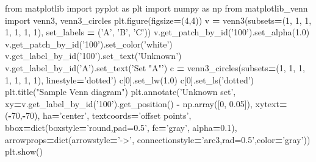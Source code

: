 \documentclass[]{book}
\newenvironment{Shaded}{\begin{snugshade}}{\end{snugshade}}
\newcommand{\BuiltInTok}[1]{#1}
\newcommand{\DecValTok}[1]{\textcolor[rgb]{0.00,0.00,0.81}{#1}}
\newcommand{\FloatTok}[1]{\textcolor[rgb]{0.00,0.00,0.81}{#1}}
\newcommand{\ImportTok}[1]{#1}
\newcommand{\NormalTok}[1]{#1}
\newcommand{\OperatorTok}[1]{\textcolor[rgb]{0.81,0.36,0.00}{\textbf{#1}}}
\newcommand{\StringTok}[1]{\textcolor[rgb]{0.31,0.60,0.02}{#1}}
\begin{document}
\begin{Shaded}
\begin{Highlighting}[]
\ImportTok{from}\NormalTok{ matplotlib }\ImportTok{import}\NormalTok{ pyplot }\ImportTok{as}\NormalTok{ plt}
\ImportTok{import}\NormalTok{ numpy }\ImportTok{as}\NormalTok{ np}
\ImportTok{from}\NormalTok{ matplotlib_venn }\ImportTok{import}\NormalTok{ venn3, venn3_circles}
\NormalTok{plt.figure(figsize}\OperatorTok{=}\NormalTok{(}\DecValTok{4}\NormalTok{,}\DecValTok{4}\NormalTok{))}
\NormalTok{v }\OperatorTok{=}\NormalTok{ venn3(subsets}\OperatorTok{=}\NormalTok{(}\DecValTok{1}\NormalTok{, }\DecValTok{1}\NormalTok{, }\DecValTok{1}\NormalTok{, }\DecValTok{1}\NormalTok{, }\DecValTok{1}\NormalTok{, }\DecValTok{1}\NormalTok{, }\DecValTok{1}\NormalTok{), set_labels }\OperatorTok{=}\NormalTok{ (}\StringTok{'A'}\NormalTok{, }\StringTok{'B'}\NormalTok{, }\StringTok{'C'}\NormalTok{))}
\NormalTok{v.get_patch_by_id(}\StringTok{'100'}\NormalTok{).set_alpha(}\FloatTok{1.0}\NormalTok{)}
\NormalTok{v.get_patch_by_id(}\StringTok{'100'}\NormalTok{).set_color(}\StringTok{'white'}\NormalTok{)}
\NormalTok{v.get_label_by_id(}\StringTok{'100'}\NormalTok{).set_text(}\StringTok{'Unknown'}\NormalTok{)}
\NormalTok{v.get_label_by_id(}\StringTok{'A'}\NormalTok{).set_text(}\StringTok{'Set "A"'}\NormalTok{)}
\NormalTok{c }\OperatorTok{=}\NormalTok{ venn3_circles(subsets}\OperatorTok{=}\NormalTok{(}\DecValTok{1}\NormalTok{, }\DecValTok{1}\NormalTok{, }\DecValTok{1}\NormalTok{, }\DecValTok{1}\NormalTok{, }\DecValTok{1}\NormalTok{, }\DecValTok{1}\NormalTok{, }\DecValTok{1}\NormalTok{), linestyle}\OperatorTok{=}\StringTok{'dotted'}\NormalTok{)}
\NormalTok{c[}\DecValTok{0}\NormalTok{].set_lw(}\FloatTok{1.0}\NormalTok{)}
\NormalTok{c[}\DecValTok{0}\NormalTok{].set_ls(}\StringTok{'dotted'}\NormalTok{)}
\NormalTok{plt.title(}\StringTok{"Sample Venn diagram"}\NormalTok{)}
\NormalTok{plt.annotate(}\StringTok{'Unknown set'}\NormalTok{, xy}\OperatorTok{=}\NormalTok{v.get_label_by_id(}\StringTok{'100'}\NormalTok{).get_position() }\OperatorTok{-}\NormalTok{ np.array([}\DecValTok{0}\NormalTok{, }\FloatTok{0.05}\NormalTok{]), xytext}\OperatorTok{=}\NormalTok{(}\OperatorTok{-}\DecValTok{70}\NormalTok{,}\OperatorTok{-}\DecValTok{70}\NormalTok{),}
\NormalTok{             ha}\OperatorTok{=}\StringTok{'center'}\NormalTok{, textcoords}\OperatorTok{=}\StringTok{'offset points'}\NormalTok{, bbox}\OperatorTok{=}\BuiltInTok{dict}\NormalTok{(boxstyle}\OperatorTok{=}\StringTok{'round,pad=0.5'}\NormalTok{, fc}\OperatorTok{=}\StringTok{'gray'}\NormalTok{, alpha}\OperatorTok{=}\FloatTok{0.1}\NormalTok{),}
\NormalTok{                          arrowprops}\OperatorTok{=}\BuiltInTok{dict}\NormalTok{(arrowstyle}\OperatorTok{=}\StringTok{'->'}\NormalTok{, connectionstyle}\OperatorTok{=}\StringTok{'arc3,rad=0.5'}\NormalTok{,color}\OperatorTok{=}\StringTok{'gray'}\NormalTok{))}
\NormalTok{                          plt.show()}
\end{Highlighting}
\end{Shaded}
\end{document}
